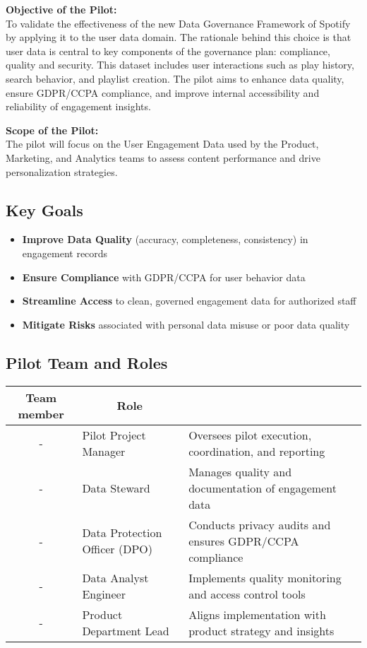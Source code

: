 \documentclass[11pt,a4paper,computermodern]{article}
\begin{document}
\textbf{Objective of the Pilot:}\\
To validate the effectiveness of the new Data Governance Framework of Spotify by applying it to the user data domain. The rationale behind this choice is that user data is central to key components of the governance plan: compliance, quality and security. This dataset includes user interactions such as play history, search behavior, and playlist creation. The pilot aims to enhance data quality, ensure GDPR/CCPA compliance, and improve internal accessibility and reliability of engagement insights.

\textbf{Scope of the Pilot:}\\
The pilot will focus on the User Engagement Data used by the Product, Marketing, and Analytics teams to assess content performance and drive personalization strategies.


\subsection*{Key Goals}

\begin{itemize}[itemsep=5pt, parsep=0pt]
	\item \textbf{Improve Data Quality} (accuracy, completeness, consistency) in engagement records
	\item \textbf{Ensure Compliance} with GDPR/CCPA for user behavior data
	\item \textbf{Streamline Access} to clean, governed engagement data for authorized staff
	\item \textbf{Mitigate Risks} associated with personal data misuse or poor data quality
\end{itemize}


\subsection*{Pilot Team and Roles}

\begin{table}[ht]
	\centering
	\begin{threeparttable}
		\label{table:roles}
		\begin{tabularx}{0.99\textwidth}{c l >{\arraybackslash}X}
			\toprule
			\multicolumn{1}{c}{\textbf{Team member}} & \multicolumn{1}{c}{\textbf{Role}} & \multicolumn{1}{c}{\textbf{Responsibilities}} \\
			\midrule
			- & Pilot Project Manager & Oversees pilot execution, coordination, and reporting \\
			- & Data Steward & Manages quality and documentation of engagement data \\
			- & Data Protection Officer (DPO) & Conducts privacy audits and ensures GDPR/CCPA compliance \\
			- & Data Analyst Engineer & Implements quality monitoring and access control tools \\
			- & Product Department Lead & Aligns implementation with product strategy and insights \\
			\bottomrule
		\end{tabularx}
	\end{threeparttable}
\end{table}
\end{document}
